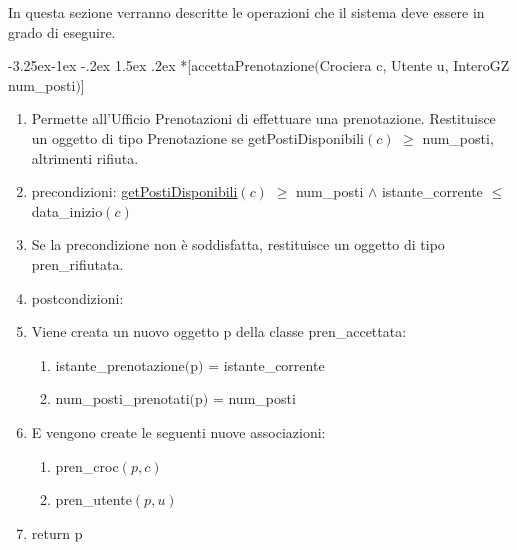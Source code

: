 \documentclass{article}
\makeatletter
\renewcommand\subsection{\@startsection{subsection}{2}{\z@}%
                                     {-3.25ex\@plus -1ex \@minus -.2ex}%
                                     {1.5ex \@plus .2ex}%
                                     {\normalfont\normalsize\bfseries}}
\makeatother
\begin{document}
In questa sezione verranno descritte le operazioni che il sistema deve essere in grado di eseguire.

\subsection*{\label{sec:OperazioneAccettaPrenotazione}[accettaPrenotazione$($Crociera c, Utente u, InteroGZ num\_posti$)$]}
\begin{enumerate}
    \item Permette all'Ufficio Prenotazioni di effettuare una prenotazione. Restituisce un oggetto di tipo Prenotazione se getPostiDisponibili$(c)$ $\geq$ num\_posti, altrimenti rifiuta.
    \item precondizioni: \hyperref[sec:OperazioneGetPostiDisponibili]{getPostiDisponibili}$(c)$ $\geq$ num\_posti $\land$ istante\_corrente $\leq$ data\_inizio$(c)$
    \item Se la precondizione non è soddisfatta, restituisce un oggetto di tipo pren\_rifiutata.
    \item postcondizioni:
    \item Viene creata un nuovo oggetto p della classe pren\_accettata:
    \begin{enumerate}
        \item istante\_prenotazione$($p$)$ = istante\_corrente
        \item num\_posti\_prenotati$($p$)$ = num\_posti
    \end{enumerate}
    \item E vengono create le seguenti nuove associazioni:
    \begin{enumerate}
        \item pren\_croc$(p,c)$
        \item pren\_utente$(p,u)$
    \end{enumerate}
    \item return p
\end{enumerate}
\end{document}
